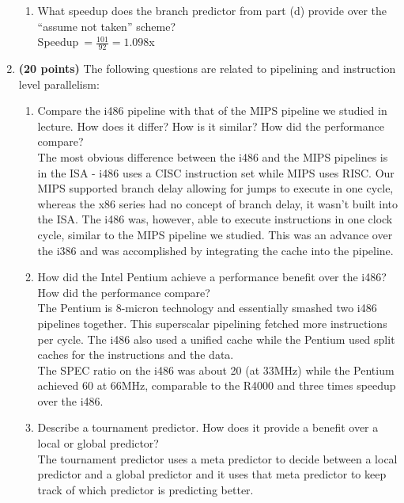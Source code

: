 \documentclass[11pt]{article}
\begin{document}
\begin{enumerate}
\begin{enumerate}
        \item What speedup does the branch predictor from part (d) provide over the “assume not taken” scheme?\\[1em]
        Speedup$\ =\frac{101}{92}=1.098$x

    \end{enumerate}
\newpage
    \item \textbf{(20 points)} The following questions are related to pipelining and instruction level parallelism:
    \begin{enumerate}
        \item Compare the i486 pipeline with that of the MIPS pipeline we studied in lecture. How does it differ? How is it similar? How did the performance compare?\\[1em]
        The most obvious difference between the i486 and the MIPS pipelines is in the ISA - i486 uses a CISC instruction set while MIPS uses RISC. Our MIPS supported branch delay allowing for jumps to execute in one cycle, whereas the x86 series had no concept of branch delay, it wasn’t built into the ISA. The i486 was, however, able to execute instructions in one clock cycle, similar to the MIPS pipeline we studied. This was an advance over the i386 and was accomplished by integrating the cache into the pipeline.\\

        \item How did the Intel Pentium achieve a performance benefit over the i486? How did the performance compare?\\[1em]
        The Pentium is 8-micron technology and essentially smashed two i486 pipelines together. This superscalar pipelining fetched more instructions per cycle. The i486 also used a unified cache while the Pentium used split caches for the instructions and the data.\\

        The SPEC ratio on the i486 was about 20 (at 33MHz) while the Pentium achieved 60 at 66MHz, comparable to the R4000 and three times speedup over the i486.\\

        \item Describe a tournament predictor. How does it provide a benefit over a local or global predictor?\\[1em]
        The tournament predictor uses a meta predictor to decide between a local predictor and a global predictor and it uses that meta predictor to keep track of which predictor is predicting better.\\


\end{enumerate}
\end{enumerate}
\end{document}
